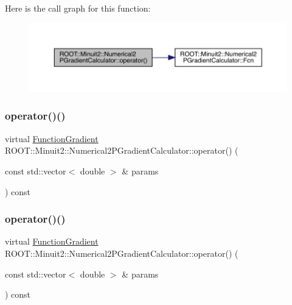 Here is the call graph for this function\+:
\nopagebreak
\begin{figure}[H]
\begin{center}
\leavevmode
\includegraphics[width=350pt]{d0/d82/classROOT_1_1Minuit2_1_1Numerical2PGradientCalculator_ae0501810e548a264aa74855d586b0d13_cgraph}
\end{center}
\end{figure}
\mbox{\label{classROOT_1_1Minuit2_1_1Numerical2PGradientCalculator_a213b721d22f8c8f91d85841d7ee1a000}} 
\subsubsection{\texorpdfstring{operator()()}{operator()()}\hspace{0.1cm}{\footnotesize\ttfamily [5/9]}}
{\footnotesize\ttfamily virtual \mbox{\hyperlink{classROOT_1_1Minuit2_1_1FunctionGradient}{Function\+Gradient}} R\+O\+O\+T\+::\+Minuit2\+::\+Numerical2\+P\+Gradient\+Calculator\+::operator() (\begin{DoxyParamCaption}\item[{const std\+::vector$<$ double $>$ \&}]{params }\end{DoxyParamCaption}) const\hspace{0.3cm}{\ttfamily [virtual]}}

\mbox{\label{classROOT_1_1Minuit2_1_1Numerical2PGradientCalculator_a213b721d22f8c8f91d85841d7ee1a000}} 
\subsubsection{\texorpdfstring{operator()()}{operator()()}\hspace{0.1cm}{\footnotesize\ttfamily [6/9]}}
{\footnotesize\ttfamily virtual \mbox{\hyperlink{classROOT_1_1Minuit2_1_1FunctionGradient}{Function\+Gradient}} R\+O\+O\+T\+::\+Minuit2\+::\+Numerical2\+P\+Gradient\+Calculator\+::operator() (\begin{DoxyParamCaption}\item[{const std\+::vector$<$ double $>$ \&}]{params }\end{DoxyParamCaption}) const\hspace{0.3cm}{\ttfamily [virtual]}}

